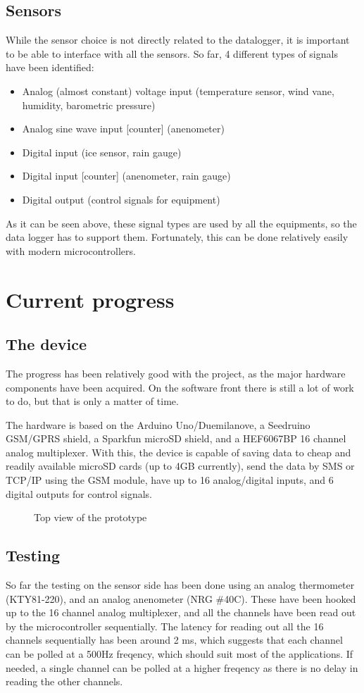\documentclass{project}
\begin{document}
\subsection{Sensors}
While the sensor choice is not directly related to the datalogger, it is important to be able to interface with all the sensors. So far, 4 different types of signals have been identified:
\begin{itemize}\addtolength{\itemsep}{-0.5\baselineskip}
\item Analog (almost constant) voltage input (temperature sensor, wind vane, humidity, barometric pressure)
\item Analog sine wave input [counter] (anenometer)
\item Digital input (ice sensor, rain gauge)
\item Digital input [counter] (anenometer, rain gauge)
\item Digital output (control signals for equipment)
\end{itemize}
As it can be seen above, these signal types are used by all the equipments, so the data logger has to support them. Fortunately, this can be done relatively easily with modern microcontrollers.

\section{Current progress}
\subsection{The device}
The progress has been relatively good with the project, as the major hardware components have been acquired. On the software front there is still a lot of work to do, but that is only a matter of time. 

The hardware is based on the Arduino Uno/Duemilanove, a Seedruino GSM/GPRS shield, a Sparkfun microSD shield, and a HEF6067BP 16 channel analog multiplexer.
With this, the device is capable of saving data to cheap and readily available microSD cards (up to 4GB currently), send the data by SMS or TCP/IP using the GSM module, have up to 16 analog/digital inputs, and 6 digital outputs for control signals.   

\begin{figure}[!ht]
\centering
{}
\caption{Top view of the prototype}
\label{topview}
\end{figure}

\subsection{Testing}
So far the testing on the sensor side has been done using an analog thermometer (KTY81-220), and an analog anenometer (NRG \#40C). These have been hooked up to the 16 channel analog multiplexer, and all the channels have been read out by the microcontroller sequentially. 
The latency for reading out all the 16 channels sequentially has been around 2 ms, which suggests that each channel can be polled at a 500Hz freqency, which should suit most of the applications. If needed, a single channel can be polled at a higher freqency as there is no delay in reading the other channels.
\end{document}
